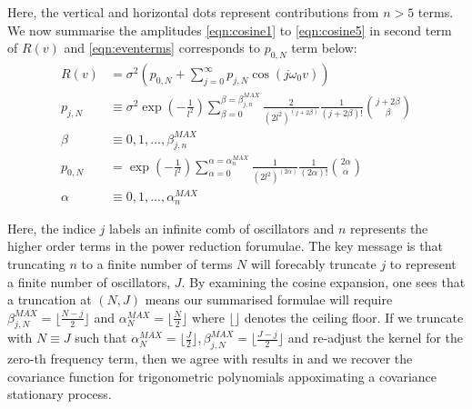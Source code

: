\begin{widetext}
Here, the vertical and horizontal dots represent contributions from $n>5$ terms. We now summarise the amplitudes \cref{eqn:cosine1} to  \cref{eqn:cosine5} in second term of $R(v)$ and  \cref{eqn:eventerms} corresponds to $p_{0,N}$ term below:
\begin{align}
R(v) &= \sigma^2 (p_{0,N} + \sum_{j=0}^{\infty} p_{j,N} \cos(j\omega_0 v))\\
p_{j,N} & \equiv \sigma^2 \exp (- \frac{1}{l^2}) \sum_{\beta = 0}^{\beta = \beta_{j,n}^{MAX}} \frac{2}{(2l^2)^{(j + 2\beta)}} \frac{1}{(j + 2\beta)!} \binom{j + 2\beta}{\beta} \label{eqn:beta_series2} \\
\beta &\equiv  0,1,..., \beta_{j,n}^{MAX}  \\
p_{0,N} &= \exp (- \frac{1}{l^2}) \sum_{\alpha = 0}^{\alpha = \alpha_{n}^{MAX}} \frac{1}{(2l^2)^{(2\alpha)}} \frac{1}{(2\alpha)!} \binom{2\alpha}{\alpha} \label{eqn:alpha_series}\\
\alpha &\equiv  0,1,..., \alpha_{n}^{MAX} 
\end{align}

Here, the indice $j$ labels an infinite comb of oscillators and $n$ represents the higher order terms in the power reduction forumulae. The key message is that truncating $n$ to a finite number of terms $N$ will forecably truncate $j$ to represent a finite number of oscillators, $J$. By examining the cosine expansion, one sees that a truncation at $(N, J)$ means our summarised formulae will require $\beta_{j,N}^{MAX} = \lfloor\frac{N-j}{2}\rfloor$ and $\alpha_{N}^{MAX} = \lfloor\frac{N}{2}\rfloor$  where $\lfloor \rfloor$ denotes the ceiling floor. If we truncate with $N \equiv J$ such that $\alpha_{N}^{MAX} = \lfloor\frac{J}{2}\rfloor, \beta_{j,N}^{MAX} =  \lfloor\frac{J-j}{2}\rfloor $ and re-adjust the kernel for the zero-th frequency term, then we agree with results in \cite{solin2014explicit} and we recover the covariance function for trigonometric polynomials appoximating a covariance stationary process. 
\end{widetext}

\iffalse %
\begin{align}
\sigma_k, R_k &\equiv \iota_0 10^{\iota_1} \\
\iota_0 & \sim \mathcal{U}[0, 1]\\
\iota_1 & \sim \mathcal{U}[\{ -\iota_{max}, -\iota_{max} + 1,  \hdots,  \iota_{min}\}]
\end{align}
Scale magnitudes are set by $\iota_1$, a random integer chosen with uniform probability over $\{ -\iota_{max}, \hdots, \iota_{min} \}$ where we set $\iota_{min} = 3, \iota_{max} = 8$  such that $10^{-\iota_{max}}$ is sufficiently high to avoid machine floating point errors from recursive calculations over $> 10^3$ measurements. Uniformly distributed floating points for $\sigma_k, R_k $ in each order of magnitude is set by $\iota_0$. 
\fi